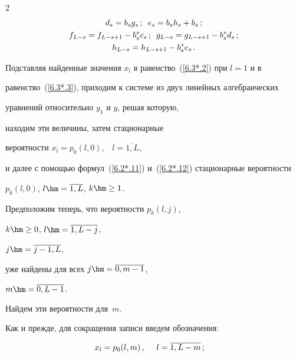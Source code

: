 \begin{multicols}{2}
\begin{gather*}
d_{s} = b_{s} g_{s}\,;


\enskip


e_{s} = b_{s} h_{s} + b_{s}\,;


\\


f_{L-s} =f_{L-s+1} - b^*_{s} c_{s}\,;


\enskip 


g_{L-s} = g_{L-s+1} - b^*_{s} d_{s}\,;


\\ 


h_{L-s} = h_{L-s+1} - b^*_{s} e_{s}\,.


\end{gather*}





Подставляя найденные значения $x_l$ в равенство~(\ref{6.3*.2}) при $l=1$ и в 


равенство~(\ref{6.3*.3}), приходим к сис\-те\-ме из двух линейных алгебраических


уравнений относительно $y_1$ и $y$, решая которую,


находим эти величины, затем стационарные


ве\-ро\-ят\-ности $x_l=p_{0}(l,0)$,\ \ $l=\overline{1,L}$,


и далее с по\-мощью формул~(\ref{6.2*.11}) и~(\ref{6.2*.12}) стационарные вероятности


$p_{k}(l,0)$, $l\hm=\overline{1,L}$, $k\hm\ge 1$.





Предположим теперь, что вероятности $p_{k}(l,j)$,


$k\hm\ge0$, $l\hm=\overline{1,L-j}$,


$j\hm=\overline{j-1,L}$,


уже найдены для всех $j\hm=\overline{0,m-1}$,


$m\hm=\overline{0,L-1}$.


Найдем эти вероятности для~$m$.





Как и прежде, для сокращения записи введем обозначения:





\noindent


\begin{alignat*}{2}


x_l &= p_{0}(l,m)\,,&\enskip l&=\overline{1,L-m}\,;



\end{alignat*}
\end{multicols}

